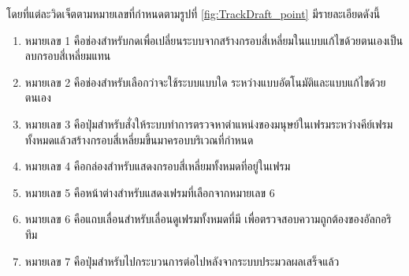 โดยที่แต่ละวิดเจ็ตตามหมายเลขที่กำหนดตามรูปที่ \ref{fig:TrackDraft_point} มีรายละเอียดดังนี้
\begin{enumerate}
	\setlength\itemsep{-0.25em}
    \item หมายเลข 1 คือช่องสำหรับกดเพื่อเปลี่ยนระบบจากสร้างกรอบสี่เหลี่ยมในแบบแก้ไขด้วยตนเองเป็นลบกรอบสี่เหลี่ยมแทน
    \item หมายเลข 2 คือช่องสำหรับเลือกว่าจะใช้ระบบแบบใด ระหว่างแบบอัตโนมัติและแบบแก้ไขด้วยตนเอง
    \item หมายเลข 3 คือปุ่มสำหรับสั่งให้ระบบทำการตรวจหาตำแหน่งของมนุษย์ในเฟรมระหว่างคีย์เฟรมทั้งหมดแล้วสร้างกรอบสี่เหลี่ยมขึ้นมาครอบบริเวณที่กำหนด
	\item หมายเลข 4 คือกล่องสำหรับแสดงกรอบสี่เหลี่ยมทั้งหมดที่อยู่ในเฟรม
	\item หมายเลข 5 คือหน้าต่างสำหรับแสดงเฟรมที่เลือกจากหมายเลข 6
	\item หมายเลข 6 คือแถบเลื่อนสำหรับเลื่อนดูเฟรมทั้งหมดที่มี เพื่อตรวจสอบความถูกต้องของอัลกอริทึม
	\item หมายเลข 7 คือปุ่มสำหรับไปกระบวนการต่อไปหลังจากระบบประมวลผลเสร็จแล้ว
\end{enumerate}
\clearpage

